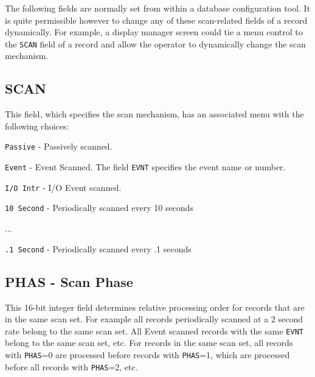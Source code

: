 The following fields are normally set from within a database configuration tool.
It is quite permissible however to change any of these scan-related fields of a record dynamically.
For example, a display manager screen could tie a menu control to the \verb|SCAN| field of a record and allow the operator to dynamically change the scan mechanism.

\subsection{SCAN}

This field, which specifies the scan mechanism, has an associated menu with the following choices:

\begin{description}
\item \verb|Passive| - Passively scanned.

\item \verb|Event| - Event Scanned. The field \verb|EVNT| specifies the event name or number.

\item \verb|I/O Intr| - I/O Event scanned.

\item \verb|10 Second| - Periodically scanned every 10 seconds

\item ...

\item \verb|.1 Second| - Periodically scanned every .1 seconds

\end{description}

\subsection{PHAS - Scan Phase}

This 16-bit integer field determines relative processing order for records that are in the same scan set.
For example all records periodically scanned at a 2 second rate belong to the same scan set.
All Event scanned records with the same \verb|EVNT| belong to the same scan set, etc.
For records in the same scan set, all records with \verb|PHAS|=0 are processed before records with \verb|PHAS|=1, which are processed before all records with \verb|PHAS|=2, etc.

